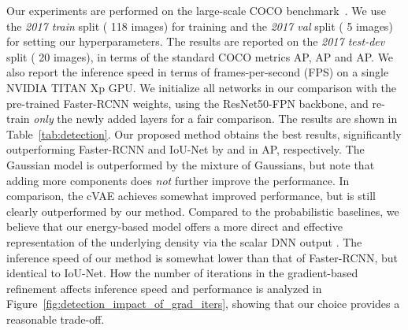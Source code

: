 \documentclass[runningheads]{llncs}
\begin{document}
Our experiments are performed on the large-scale COCO benchmark~\cite{lin2014microsoft}. We use the \emph{2017 train} split ( 118 images) for training and the \emph{2017 val} split ( 5 images) for setting our hyperparameters. The results are reported on the \emph{2017 test-dev} split (  20 images), in terms of the standard COCO metrics AP,  AP and AP. We also report the inference speed in terms of frames-per-second (FPS) on a single NVIDIA TITAN Xp GPU. We initialize all networks in our comparison with the pre-trained Faster-RCNN weights, using the ResNet50-FPN \cite{lin2017feature} backbone, and re-train \emph{only} the newly added layers for a fair comparison. The results are shown in Table~\ref{tab:detection}. Our proposed method obtains the best results, significantly outperforming Faster-RCNN and IoU-Net by  and  in AP, respectively. The Gaussian model is outperformed by the mixture of  Gaussians, but note that adding more components does \emph{not} further improve the performance. In comparison, the cVAE achieves somewhat improved performance, but is still clearly outperformed by our method. Compared to the probabilistic baselines, we believe that our energy-based model offers a more direct and effective representation of the underlying density via the scalar DNN output . The inference speed of our method is somewhat lower than that of Faster-RCNN, but identical to IoU-Net. How the number of iterations  in the gradient-based refinement affects inference speed and performance is analyzed in Figure~\ref{fig:detection_impact_of_grad_iters}, showing that our choice  provides a reasonable trade-off.
\end{document}
